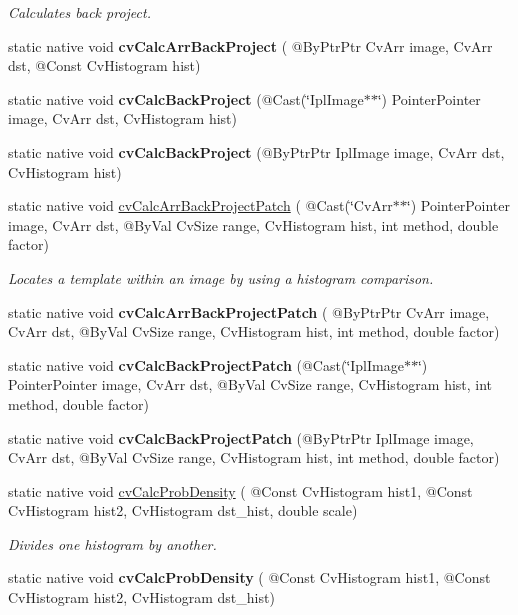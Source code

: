 \begin{DoxyCompactItemize}
\begin{DoxyCompactList}\small\item\em Calculates back project. \end{DoxyCompactList}\item 
static native void {\bfseries cv\+Calc\+Arr\+Back\+Project} ( @By\+Ptr\+Ptr Cv\+Arr image, Cv\+Arr dst, @Const Cv\+Histogram hist)
\item 
static native void {\bfseries cv\+Calc\+Back\+Project} (@Cast(\char`\"{}Ipl\+Image$\ast$$\ast$\char`\"{}) Pointer\+Pointer image, Cv\+Arr dst, Cv\+Histogram hist)
\item 
static native void {\bfseries cv\+Calc\+Back\+Project} (@By\+Ptr\+Ptr Ipl\+Image image, Cv\+Arr dst, Cv\+Histogram hist)
\item 
static native void \hyperlink{group__imgproc__c_ga31746133be041f7be11b46e7df88363e}{cv\+Calc\+Arr\+Back\+Project\+Patch} ( @Cast(\char`\"{}Cv\+Arr$\ast$$\ast$\char`\"{}) Pointer\+Pointer image, Cv\+Arr dst, @By\+Val Cv\+Size range, Cv\+Histogram hist, int method, double factor)
\begin{DoxyCompactList}\small\item\em Locates a template within an image by using a histogram comparison. \end{DoxyCompactList}\item 
static native void {\bfseries cv\+Calc\+Arr\+Back\+Project\+Patch} ( @By\+Ptr\+Ptr Cv\+Arr image, Cv\+Arr dst, @By\+Val Cv\+Size range, Cv\+Histogram hist, int method, double factor)
\item 
static native void {\bfseries cv\+Calc\+Back\+Project\+Patch} (@Cast(\char`\"{}Ipl\+Image$\ast$$\ast$\char`\"{}) Pointer\+Pointer image, Cv\+Arr dst, @By\+Val Cv\+Size range, Cv\+Histogram hist, int method, double factor)
\item 
static native void {\bfseries cv\+Calc\+Back\+Project\+Patch} (@By\+Ptr\+Ptr Ipl\+Image image, Cv\+Arr dst, @By\+Val Cv\+Size range, Cv\+Histogram hist, int method, double factor)
\item 
static native void \hyperlink{group__imgproc__c_ga4a08e20f0a1dc639f2d1052b77f9a024}{cv\+Calc\+Prob\+Density} ( @Const Cv\+Histogram hist1, @Const Cv\+Histogram hist2, Cv\+Histogram dst\+\_\+hist, double scale)
\begin{DoxyCompactList}\small\item\em Divides one histogram by another. \end{DoxyCompactList}\item 
static native void {\bfseries cv\+Calc\+Prob\+Density} ( @Const Cv\+Histogram hist1, @Const Cv\+Histogram hist2, Cv\+Histogram dst\+\_\+hist)
$$
\end{DoxyCompactItemize}
